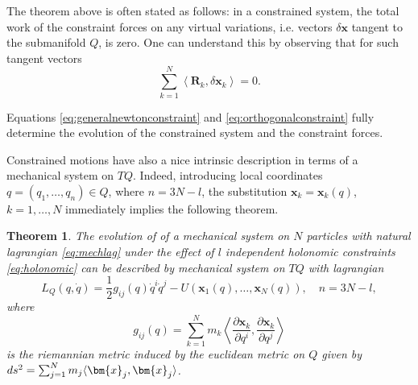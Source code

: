 \documentclass[english,fontsize=11pt,paper=a5,oneside]{scrbook}
\newcommand{\bx}{\bm{x}}
\newcommand{\lag}{\langle}
\newcommand{\rag}{\rangle}
\let\d\relax
\DeclareMathOperator{\d}{d}
\newtheorem{theorem}{Theorem}[chapter]
\theoremstyle{definition}
\newenvironment{remark}
  {\pushQED{\qed}\renewcommand{\qedsymbol}{$\lozenge$}\remarkx}
  {\popQED\endremarkx}
\begin{document}
\begin{remark}
    The theorem above is often stated as follows: in a constrained system, the total work of the constraint forces on any virtual variations, i.e. vectors $\delta\bx$ tangent to the submanifold $Q$, is zero.
    One can understand this by observing that for such tangent vectors
    \begin{equation}\label{eq:orthogonalconstraint}
        \sum_{k=1}^N \left\lag\bm{R}_k, \delta\bx_k\right\rag = 0.
    \end{equation}
\end{remark}

Equations \eqref{eq:generalnewtonconstraint} and \eqref{eq:orthogonalconstraint} fully determine the evolution of the constrained system and the constraint forces.

Constrained motions have also a nice intrinsic description in terms of a mechanical system on $TQ$. Indeed, introducing local coordinates $q= (q_1, \ldots, q_n)\in Q$, where $n = 3N-l$, the substitution $\bx_k = \bx_k(q)$, $k=1,\ldots,N$ immediately implies the following theorem.

\begin{theorem}
    The evolution of of a mechanical system on $N$ particles with natural lagrangian \eqref{eq:mechlag} under the effect of $l$ independent holonomic constraints \eqref{eq:holonomic} can be described by mechanical system on $TQ$ with lagrangian
    \begin{equation}
        L_Q(q,\dot q) = \frac12 g_{ij}(q)\dot q^i \dot q^j - U(\bx_1(q),\ldots,\bx_N(q)), \quad n = 3N-l,
    \end{equation}
    where
    \begin{equation}
        g_{ij}(q) = \sum_{k=1}^N m_k\left\lag\frac{\partial \bx_k}{\partial q^i},\frac{\partial \bx_k}{\partial q^j}\right\rag
    \end{equation}
    is the riemannian metric induced by the euclidean metric on $Q$ given by
    $ds^2 = \sum_{j=1}^N m_j\lag\d \bx_j, \d\bx_j\rag$.
\end{theorem}
\end{document}
